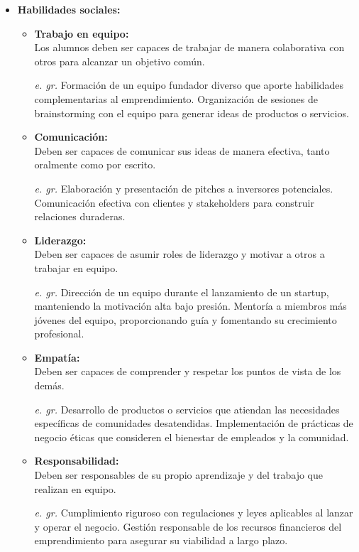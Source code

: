 \begin{itemize}
\begin{itemize}
    \end{itemize}
    \item \textbf{Habilidades sociales:}
    \begin{itemize}
        \item \textbf{Trabajo en equipo: }\\
        Los alumnos deben ser capaces de trabajar de manera colaborativa con otros para alcanzar un objetivo común.
        \item[\textit{e. gr.}] Formación de un equipo fundador diverso que aporte habilidades complementarias al emprendimiento. Organización de sesiones de brainstorming con el equipo para generar ideas de productos o servicios.
        \item \textbf{Comunicación: }\\
        Deben ser capaces de comunicar sus ideas de manera efectiva, tanto oralmente como por escrito.
        \item[\textit{e. gr.}]Elaboración y presentación de pitches a inversores potenciales. Comunicación efectiva con clientes y stakeholders para construir relaciones duraderas.
        \item \textbf{Liderazgo:}\\
        Deben ser capaces de asumir roles de liderazgo y motivar a otros a trabajar en equipo.
        \item[\textit{e. gr.}]Dirección de un equipo durante el lanzamiento de un startup, manteniendo la motivación alta bajo presión. Mentoría a miembros más jóvenes del equipo, proporcionando guía y fomentando su crecimiento profesional.
        \item \textbf{Empatía:}\\
         Deben ser capaces de comprender y respetar los puntos de vista de los demás.
         \item[\textit{e. gr.}] Desarrollo de productos o servicios que atiendan las necesidades específicas de comunidades desatendidas. Implementación de prácticas de negocio éticas que consideren el bienestar de empleados y la comunidad.
         \item \textbf{Responsabilidad: }\\
         Deben ser responsables de su propio aprendizaje y del trabajo que realizan en equipo.
         \item[\textit{e. gr.}]
         Cumplimiento riguroso con regulaciones y leyes aplicables al lanzar y operar el negocio. Gestión responsable de los recursos financieros del emprendimiento para asegurar su viabilidad a largo plazo.

\end{itemize}
\end{itemize}
